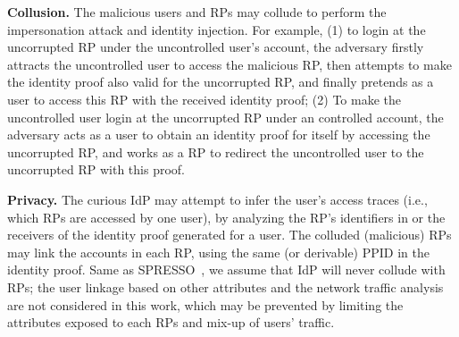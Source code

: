 \textbf{Collusion.} The malicious users and RPs may collude to perform the impersonation attack and identity injection. For example, (1) to login at the uncorrupted RP under the uncontrolled user's account, the adversary firstly attracts the uncontrolled user to access the malicious RP, then attempts to make the identity proof also valid for the uncorrupted RP, and finally pretends as a user to access this RP with the received identity proof; (2) To make the uncontrolled user login at the uncorrupted RP under an controlled account, the adversary acts as a user to obtain an identity proof for itself by accessing the uncorrupted RP, and works as a RP to redirect the uncontrolled user to the uncorrupted RP with this proof.


\noindent\textbf{Privacy.} The curious IdP may attempt to infer the user's access traces (i.e., which RPs are accessed by one user), by analyzing the RP's identifiers in or the receivers of  the identity proof generated for a user. The colluded (malicious) RPs may link the accounts in each RP, using the same (or derivable) PPID in the identity proof. Same as SPRESSO~\cite{SPRESSO}, we assume that IdP will never collude with RPs; the user linkage based on other attributes and the network traffic analysis are not considered in this work, which may be prevented by limiting the attributes exposed to each RPs and mix-up of users' traffic.

